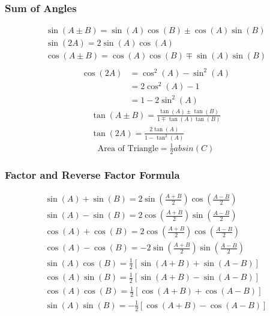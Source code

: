 \documentclass[../main]{subfiles}
\begin{document}
	\subsubsection{Sum of Angles}
	\begin{equation*} \begin{gathered}
		\sin(A \pm B) = \sin(A)\cos(B) \pm \cos(A)\sin(B) \\
		\sin(2A) = 2\sin(A)\cos(A) \\
		\cos(A \pm B) = \cos(A)\cos(B) \mp \sin(A)\sin(B) \\
	\end{gathered} \end{equation*}
	\begin{equation*} \begin{split}
		\cos(2A) & = \cos^2(A) - \sin^2(A) \\
				& = 2\cos^2(A) - 1 \\
				& = 1 - 2\sin^2(A)
	\end{split} \end{equation*}
	\begin{equation*} \begin{gathered}
		\tan(A \pm B) = \frac{\tan(A) \pm \tan(B)}{1 \mp \tan(A)\tan(B)} \\
		\tan(2A) = \frac{2\tan(A)}{1-\tan^2(A)} 
	\end{gathered} \end{equation*}
	\[ \text{Area of Triangle} = \tfrac{1}{2}absin(C) \]
	\subsubsection{Factor and Reverse Factor Formula}
	\begin{equation*} \begin{gathered}
		\sin(A)+\sin(B) = 2\sin(\tfrac{A+B}{2})\cos(\tfrac{A-B}{2}) \\
		\sin(A)-\sin(B) = 2\cos(\tfrac{A+B}{2})\sin(\tfrac{A-B}{2}) \\
		\cos(A)+\cos(B) = 2\cos(\tfrac{A+B}{2})\cos(\tfrac{A-B}{2}) \\
		\cos(A)-\cos(B) = -2\sin(\tfrac{A+B}{2})\sin(\tfrac{A-B}{2}) \\
		\sin(A)\cos(B) = \tfrac{1}{2} [ \sin(A+B) + \sin(A-B) ] \\
		\cos(A)\sin(B) = \tfrac{1}{2} [ \sin(A+B) - \sin(A-B) ] \\ 
		\cos(A)\cos(B) = \tfrac{1}{2} [ \cos(A+B) + \cos(A-B) ] \\
		\sin(A)\sin(B) = -\tfrac{1}{2} [ \cos(A+B) - \cos(A-B) ]
	\end{gathered} \end{equation*}
\end{document}
